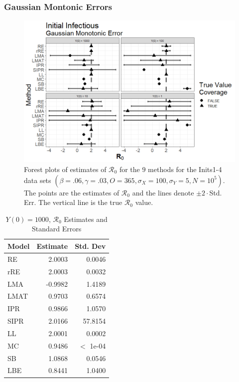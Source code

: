 \documentclass[12pt]{article}
\newcommand{\xxsir}{\ensuremath{9} } %
\newcommand{\rr}{\ensuremath{\mathcal{R}_0}}
\begin{document}
\subsubsection{Gaussian Montonic Errors}

\begin{figure}[H]
	\centering
	\includegraphics[scale=0.5]{images/start_nm.tiff}
	\caption{Forest plots of estimates of $\rr$ for the \xxsir methods for the Inits1-4 data sets $(\beta=.06, \gamma=.03, O=365, \sigma_X=100, \sigma_Y=5, N=10^5)$.  The points are the estimates of $\rr$ and the lines denote $\pm 2\cdot $Std. Err.  The vertical line is the true $\rr$ value.}
\end{figure}


\begin{table}[H]
	
	\centering
	\begin{tabular}[t]{l|r|r}
		\hline
		Model & Estimate & Std. Dev\\
		\hline
		RE & 2.0003 & 0.0046\\
		\hline
		rRE & 2.0003 & 0.0032\\
		\hline
		LMA & -0.9982 & 1.4189\\
		\hline
		LMAT & 0.9703 & 0.6574\\
		\hline
		IPR & 0.9866 & 1.0570\\
		\hline
		SIPR & 2.0166 & 57.8154\\
		\hline
		LL & 2.0001 & 0.0002\\
		\hline
		MC & 0.9486 & $<$ 1e-04\\
		\hline
		SB & 1.0868 & 0.0546\\
		\hline
		LBE & 0.8441 & 1.0400\\
		\hline
	\end{tabular}
	\caption{$Y(0) = 1000$, $\rr$ Estimates and Standard Errors}
\end{table}
\end{document}
